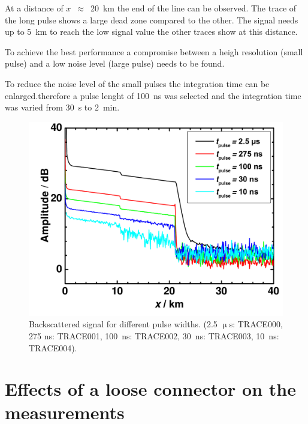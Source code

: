 At a distance of $x$~$\approx$~20~km the end of the line can be observed.
The trace of the long pulse shows a large dead zone compared to the other. The signal needs up to 5~km to reach the low signal value the other traces show at this distance. 

To achieve the best performance a compromise between a heigh resolution (small pulse) and a low noise level (large pulse) needs to be found.

To reduce the noise level of the small pulses the integration time can be enlarged.therefore a pulse lenght of 100~ns was selected and the integration time was varied from 30~s to 2~min. 

\begin{figure}%
\centering
\includegraphics[width=.6\columnwidth]{grafiken/1_time.pdf}%
\caption{Backscattered signal for different pulse widths. (2.5 $\upmu$s: TRACE000, 275 ns: TRACE001, 100~ns: TRACE002, 30~ns: TRACE003, 10~ns: TRACE004).}%
\label{fig:1_time}%
\end{figure}




% 
%
%
%
%




\section{Effects of a loose connector on the measurements}

